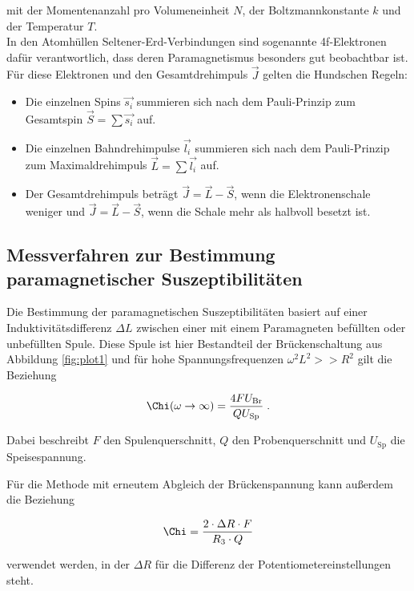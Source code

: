 mit der Momentenanzahl pro Volumeneinheit $N$, der Boltzmannkonstante $k$ und der
Temperatur $T$.\\

In den Atomhüllen Seltener-Erd-Verbindungen sind sogenannte 4f-Elektronen dafür verantwortlich,
dass deren Paramagnetismus besonders gut beobachtbar ist. Für diese Elektronen und
den Gesamtdrehimpuls $\vec{J}$ gelten die Hundschen Regeln:

\begin{itemize}
    \item Die einzelnen Spins $\vec{s_i}$ summieren sich nach dem Pauli-Prinzip zum Gesamtspin
    $\vec{S} = \sum \vec{s_i}$ auf.
    \item Die einzelnen Bahndrehimpulse $\vec{l_i}$ summieren sich nach dem Pauli-Prinzip zum Maximaldrehimpuls 
    $\vec{L} = \sum \vec{l_i}$ auf.
    \item Der Gesamtdrehimpuls beträgt $\vec{J} = \vec{L} - \vec{S}$, wenn die Elektronenschale weniger und
    $\vec{J} = \vec{L} - \vec{S}$, wenn die Schale mehr als halbvoll besetzt ist.
\end{itemize}

\subsection{Messverfahren zur Bestimmung paramagnetischer Suszeptibilitäten}

Die Bestimmung der paramagnetischen Suszeptibilitäten basiert auf einer
Induktivitätsdifferenz $\Delta L$ zwischen einer mit einem Paramagneten 
befüllten oder unbefüllten Spule. Diese Spule ist hier Bestandteil der
Brückenschaltung aus Abbildung \ref{fig:plot1} und für hohe Spannungsfrequenzen
$\omega^2 L^2 >> R^2$ gilt die Beziehung 

\begin{equation}
    \Chi (\omega \to \infty) = \frac{4 F U_\text{Br}}{Q U_\text{Sp}} \; .
    \label{eqn:spannung}
\end{equation} 

Dabei beschreibt $F$ den Spulenquerschnitt, $Q$ den Probenquerschnitt und
$U_\text{Sp}$ die Speisespannung.

Für die Methode mit erneutem Abgleich der Brückenspannung 
kann außerdem die Beziehung 

\begin{equation}
    \Chi = \frac{2 \cdot \Delta R \cdot F}{R_3\cdot Q}
    \label{eqn:alternativ}
\end{equation}

verwendet werden, in der $\Delta R$ für die Differenz der Potentiometereinstellungen
steht.



















